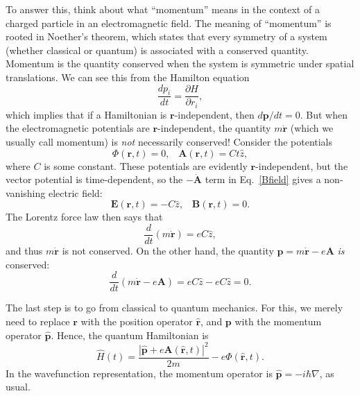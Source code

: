\documentclass[pra,12pt]{revtex4}
\begin{document}
To answer this, think about what ``momentum'' means in the context of
a charged particle in an electromagnetic field.  The meaning of
``momentum'' is rooted in Noether's theorem, which states that every
symmetry of a system (whether classical or quantum) is associated with
a conserved quantity.  Momentum is the quantity conserved when the
system is symmetric under spatial translations.  We can see this from
the Hamilton equation
\begin{equation*}
  \frac{dp_i}{dt} = \frac{\partial H}{\partial r_i},
\end{equation*}
which implies that if a Hamiltonian is $\mathbf{r}$-independent, then
$d\mathbf{p}/dt = 0$.  But when the electromagnetic potentials are
$\mathbf{r}$-independent, the quantity $m\dot{\mathbf{r}}$ (which we
usually call momentum) is \textit{not} necessarily conserved!
Consider the potentials
\begin{equation}
  \Phi(\mathbf{r}, t) = 0, \;\;\; \mathbf{A}(\mathbf{r}, t) = Ct \hat{z},
\end{equation}
where $C$ is some constant.  These potentials are evidently
$\mathbf{r}$-independent, but the vector potential is time-dependent,
so the $-\dot{\mathbf{A}}$ term in Eq.~\eqref{Bfield} gives a
non-vanishing electric field:
\begin{equation}
  \mathbf{E}(\mathbf{r},t) = - C\hat{z}, \;\;\;\mathbf{B}(\mathbf{r},t) = 0.
\end{equation}
The Lorentz force law then says that
\begin{equation}
  \frac{d}{dt}(m\dot{\mathbf{r}}) = eC\hat{z},
\end{equation}
and thus $m\dot{\mathbf{r}}$ is not conserved.  On the other hand, the
quantity $\mathbf{p} = m\dot{\mathbf{r}} - e \mathbf{A}$ \textit{is}
conserved:
\begin{equation}
  \frac{d}{dt}(m\dot{\mathbf{r}} - e\mathbf{A}) =
  eC\hat{z} - eC\hat{z} = 0.
\end{equation}

The last step is to go from classical to quantum mechanics.  For this,
we merely need to replace $\mathbf{r}$ with the position operator
$\hat{\mathbf{r}}$, and $\mathbf{p}$ with the momentum operator
$\hat{\mathbf{p}}$.  Hence, the quantum Hamiltonian is
\begin{equation}
\boxed{\qquad
  \hat{H}(t) = \frac{|\hat{\mathbf{p}}+e\mathbf{A}(\hat{\mathbf{r}},t)|^2}{2m}
  - e\Phi(\hat{\mathbf{r}},t).\qquad}
  \label{quantumH}
\end{equation}
In the wavefunction representation, the momentum operator is
$\hat{\mathbf{p}} = -i\hbar\nabla$, as usual.
\end{document}
